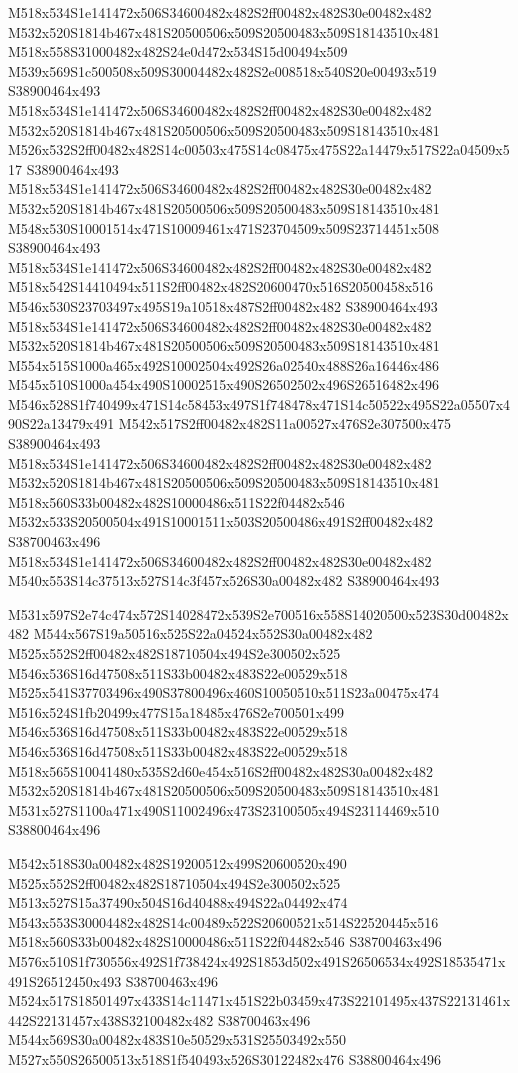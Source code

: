 \documentclass{article}
\begin{document}
\begin{multicols}{2}
M518x534S1e141472x506S34600482x482S2ff00482x482S30e00482x482 M532x520S1814b467x481S20500506x509S20500483x509S18143510x481 M518x558S31000482x482S24e0d472x534S15d00494x509 M539x569S1c500508x509S30004482x482S2e008518x540S20e00493x519 S38900464x493 M518x534S1e141472x506S34600482x482S2ff00482x482S30e00482x482 M532x520S1814b467x481S20500506x509S20500483x509S18143510x481 M526x532S2ff00482x482S14c00503x475S14c08475x475S22a14479x517S22a04509x517 S38900464x493 M518x534S1e141472x506S34600482x482S2ff00482x482S30e00482x482 M532x520S1814b467x481S20500506x509S20500483x509S18143510x481 M548x530S10001514x471S10009461x471S23704509x509S23714451x508 S38900464x493 M518x534S1e141472x506S34600482x482S2ff00482x482S30e00482x482 M518x542S14410494x511S2ff00482x482S20600470x516S20500458x516 M546x530S23703497x495S19a10518x487S2ff00482x482 S38900464x493 M518x534S1e141472x506S34600482x482S2ff00482x482S30e00482x482 M532x520S1814b467x481S20500506x509S20500483x509S18143510x481 M554x515S1000a465x492S10002504x492S26a02540x488S26a16446x486 M545x510S1000a454x490S10002515x490S26502502x496S26516482x496 M546x528S1f740499x471S14c58453x497S1f748478x471S14c50522x495S22a05507x490S22a13479x491 M542x517S2ff00482x482S11a00527x476S2e307500x475 S38900464x493 M518x534S1e141472x506S34600482x482S2ff00482x482S30e00482x482 M532x520S1814b467x481S20500506x509S20500483x509S18143510x481 M518x560S33b00482x482S10000486x511S22f04482x546 M532x533S20500504x491S10001511x503S20500486x491S2ff00482x482 S38700463x496 M518x534S1e141472x506S34600482x482S2ff00482x482S30e00482x482 M540x553S14c37513x527S14c3f457x526S30a00482x482 S38900464x493

M531x597S2e74c474x572S14028472x539S2e700516x558S14020500x523S30d00482x482 M544x567S19a50516x525S22a04524x552S30a00482x482 M525x552S2ff00482x482S18710504x494S2e300502x525 M546x536S16d47508x511S33b00482x483S22e00529x518 M525x541S37703496x490S37800496x460S10050510x511S23a00475x474 M516x524S1fb20499x477S15a18485x476S2e700501x499 M546x536S16d47508x511S33b00482x483S22e00529x518 M546x536S16d47508x511S33b00482x483S22e00529x518 M518x565S10041480x535S2d60e454x516S2ff00482x482S30a00482x482 M532x520S1814b467x481S20500506x509S20500483x509S18143510x481 M531x527S1100a471x490S11002496x473S23100505x494S23114469x510 S38800464x496

M542x518S30a00482x482S19200512x499S20600520x490 M525x552S2ff00482x482S18710504x494S2e300502x525 M513x527S15a37490x504S16d40488x494S22a04492x474 M543x553S30004482x482S14c00489x522S20600521x514S22520445x516 M518x560S33b00482x482S10000486x511S22f04482x546 S38700463x496 M576x510S1f730556x492S1f738424x492S1853d502x491S26506534x492S18535471x491S26512450x493 S38700463x496 M524x517S18501497x433S14c11471x451S22b03459x473S22101495x437S22131461x442S22131457x438S32100482x482 S38700463x496 M544x569S30a00482x483S10e50529x531S25503492x550 M527x550S26500513x518S1f540493x526S30122482x476 S38800464x496


\end{multicols}
\end{document}
